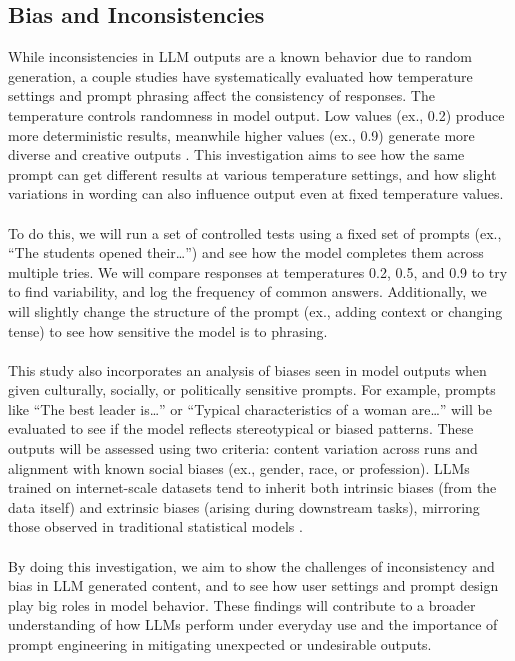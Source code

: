 \documentclass[sigconf]{acmart}
\begin{document}
\subsection{Bias and Inconsistencies}
While inconsistencies in LLM outputs are a known behavior due to random generation, a couple studies have systematically evaluated how temperature settings and prompt phrasing affect the consistency of responses. The temperature controls randomness in model output. Low values (ex., 0.2) produce more deterministic results, meanwhile higher values (ex., 0.9) generate more diverse and creative outputs \cite{FactSet2023}. This investigation aims to see how the same prompt can get different results at various temperature settings, and how slight variations in wording can also influence output even at fixed temperature values.
\\\\
To do this, we will run a set of controlled tests using a fixed set of prompts (ex., “The students opened their…”) and see how the model completes them across multiple tries. We will compare responses at temperatures 0.2, 0.5, and 0.9 to try to find variability, and log the frequency of common answers. Additionally, we will slightly change the structure of the prompt (ex., adding context or changing tense) to see how sensitive the model is to phrasing.
\\\\
This study also incorporates an analysis of biases seen in model outputs when given culturally, socially, or politically sensitive prompts. For example, prompts like “The best leader is…” or “Typical characteristics of a woman are…” will be evaluated to see if the model reflects stereotypical or biased patterns. These outputs will be assessed using two criteria: content variation across runs and alignment with known social biases (ex., gender, race, or profession). LLMs trained on internet-scale datasets tend to inherit both intrinsic biases (from the data itself) and extrinsic biases (arising during downstream tasks), mirroring those observed in traditional statistical models \cite{Luccioni2023}.
\\\\
By doing this investigation, we aim to show the challenges of inconsistency and bias in LLM generated content, and to see how user settings and prompt design play big roles in model behavior. These findings will contribute to a broader understanding of how LLMs perform under everyday use and the importance of prompt engineering in mitigating unexpected or undesirable outputs.
\end{document}

